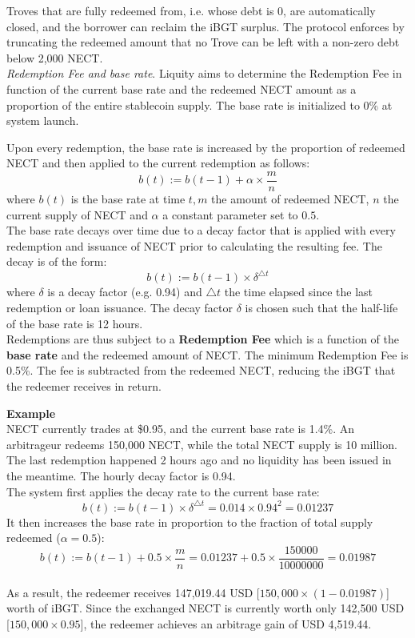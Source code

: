 \documentclass{article}
\begin{document}
Troves that are fully redeemed from, i.e. whose debt is 0, are automatically closed, and the borrower can reclaim the iBGT surplus. The protocol enforces by truncating the redeemed amount that no Trove can be left with a non-zero debt below 2,000 NECT. \\

\textit{Redemption Fee and base rate}. Liquity aims to determine the Redemption Fee in function of the current base rate and the redeemed NECT amount as a proportion of the entire stablecoin supply. The base rate is initialized to 0\% at system launch.

Upon every redemption, the base rate is increased by the proportion of redeemed NECT and then applied to the current redemption as follows:
$$b(t):=b(t-1)+\alpha\times\frac{m}{n}$$
where $b(t)$ is the base rate at time $t,m$ the amount of redeemed NECT, $n$ the current supply of NECT and $\alpha$ a constant parameter set to $0.5$.\\

The base rate decays over time due to a decay factor that is applied with every redemption and issuance of NECT prior to calculating the resulting fee. The decay is of the form:
$$b(t):=b(t-1)\times\delta^{\triangle t}$$
where $\delta$ is a decay factor (e.g. 0.94) and $\triangle t$ the time elapsed since the last redemption or loan issuance. The decay factor $\delta$ is chosen such that the half-life of the base rate is 12 hours. \\

Redemptions are thus subject to a \textbf{Redemption Fee} which is a function of the \textbf{base rate} and the redeemed amount of NECT. The minimum Redemption Fee is 0.5\%. The fee is subtracted from the redeemed NECT, reducing the iBGT that the redeemer receives in return.\\
\begin{tcolorbox}
\textbf{Example}\\
NECT currently trades at \$0.95, and the current base rate is 1.4\%. An arbitrageur redeems 150,000 NECT, while the total NECT supply is 10 million. The last redemption happened 2 hours ago and no liquidity has been issued in the meantime. The hourly decay factor is 0.94.\\

The system first applies the decay rate to the current base rate:
$$b(t):=b(t-1)\times\delta^{\triangle t}=0.014\times0.94^2=0.01237$$
It then increases the base rate in proportion to the fraction of total supply redeemed ($\alpha= 0.5$):
$$b(t):=b(t-1)+0.5\times\frac{m}{n}=0.01237+0.5\times\frac{150000}{10000000}=0.01987$$
\\

As a result, the redeemer receives 147,019.44 USD [$150,000 \times (1 - 0.01987)$] worth of iBGT. Since the exchanged NECT is currently worth only 142,500 USD [$150,000 \times 0.95$], the redeemer achieves an arbitrage gain of USD 4,519.44.
\end{tcolorbox}
\end{document}
